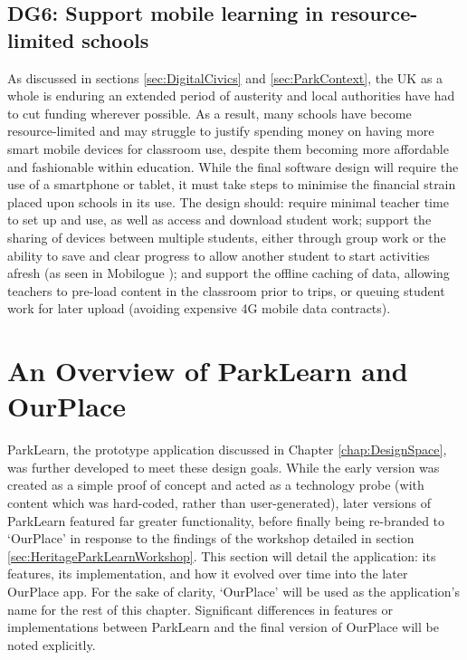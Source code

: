 \subsection*{ DG6: Support mobile learning in resource-limited schools }
\label{DG6}

As discussed in sections \ref{sec:DigitalCivics} and \ref{sec:ParkContext}, the UK as a whole is enduring an extended period of austerity and local authorities have had to cut funding wherever possible. As a result, many schools have become resource-limited and may struggle to justify spending money on having more smart mobile devices for classroom use, despite them becoming more affordable and fashionable within education. While the final software design will require the use of a smartphone or tablet, it must take steps to minimise the financial strain placed upon schools in its use. The design should: require minimal teacher time to set up and use, as well as access and download student work; support the sharing of devices between multiple students, either through group work or the ability to save and clear progress to allow another student to start activities afresh (as seen in Mobilogue \citep{Giemza2013}); and support the offline caching of data, allowing teachers to pre-load content in the classroom prior to trips, or queuing student work for later upload (avoiding expensive 4G mobile data contracts).

\section{An Overview of ParkLearn and OurPlace}

ParkLearn, the prototype application discussed in Chapter \ref{chap:DesignSpace}, was further developed to meet these design goals. While the early version was created as a simple proof of concept and acted as a technology probe (with content which was hard-coded, rather than user-generated), later versions of ParkLearn featured far greater functionality, before finally being re-branded to `OurPlace' in response to the findings of the workshop detailed in section \ref{sec:HeritageParkLearnWorkshop}. This section will detail the application: its features, its implementation, and how it evolved over time into the later OurPlace app. For the sake of clarity, `OurPlace' will be used as the application's name for the rest of this chapter. Significant differences in features or implementations between ParkLearn and the final version of OurPlace will be noted explicitly.

